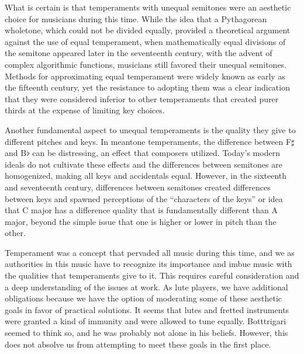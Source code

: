 What is certain is that temperaments with unequal semitones were an aesthetic choice for musicians
during this time.  While the idea that a Pythagorean wholetone, which could not be divided equally,
provided a theoretical argument against the use of equal temperament, when mathematically equal
divisions of the semitone appeared later in the seventeenth century, with the advent of complex
algorithmic functions, musicians still favored their unequal semitones.  Methods for approximating
equal temperament were widely known as early as the fifteenth century, yet the resistance to
adopting them was a clear indication that they were considered inferior to other temperaments that
created purer thirds at the expense of limiting key choices.

Another fundamental aspect to unequal temperaments is the quality they give to different pitches and
keys.  In meantone temperaments, the difference between F$\sharp$ and B$\flat$ can be distressing,
an effect that composers utilized.  Today's modern ideals do not cultivate these effects and the
differences between semitones are homogenized, making all keys and accidentals equal.  However, in
the sixteenth and seventeenth century, differences between semitones created differences between
keys and spawned perceptions of the ``characters of the keys'' or idea that C major has a difference
quality that is fundamentally different than A major, beyond the simple issue that one is higher or
lower in pitch than the other.

Temperament was a concept that pervaded all music during this time, and we as authorities in this
music have to recognize its importance and imbue music with the qualities that temperaments give to
it.  This requires careful consideration and a deep understanding of the issues at work.  As lute
players, we have additional obligations because we have the option of moderating some of these
aesthetic goals in favor of practical solutions.  It seems that lutes and fretted instruments were
granted a kind of immunity and were allowed to tune equally.  Botttrigari seemed to think so, and he
was probably not alone in his beliefs. \autocite[19]{HB:1}  However, this does not absolve us from
attempting to meet these goals in the first place.

